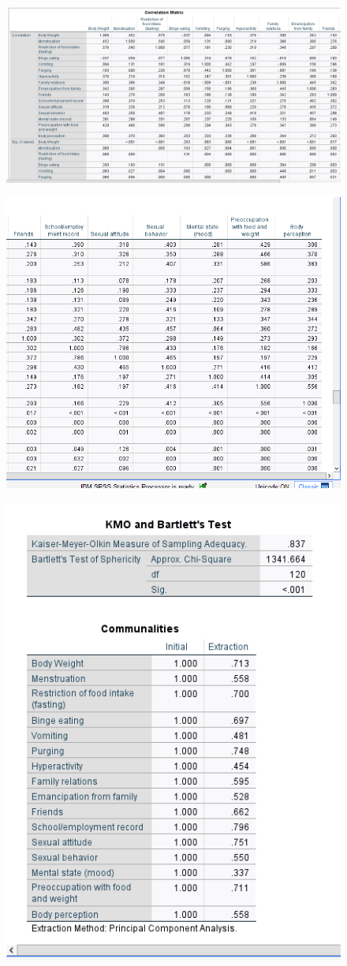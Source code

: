 \documentclass[english,10pt,a4paper]{article}
\begin{document}


\begin{figure}	
 \includegraphics[width=1\linewidth]{correlation matrix1.png}
\end{figure}

\begin{figure}
	\includegraphics[width=1\linewidth]{correlation matrix2.png}
\end{figure}


\begin{figure}
	
\includegraphics[width=0.5\linewidth]{KMO.png}
\end{figure}
\end{document}
